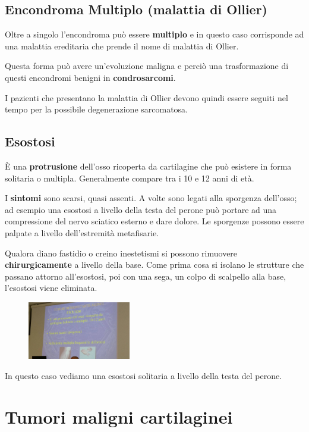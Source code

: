 \subsection{Encondroma Multiplo (malattia di Ollier)}

Oltre a singolo l'encondroma può essere \textbf{multiplo} e in questo caso corrisponde ad una malattia ereditaria che prende il nome di malattia di Ollier.

Questa forma può avere un'evoluzione maligna e perciò una trasformazione di questi encondromi benigni in \textbf{condrosarcomi}.

I pazienti che presentano la malattia di Ollier devono quindi essere seguiti nel tempo per la possibile degenerazione sarcomatosa.

\subsection{Esostosi}

È una \textbf{protrusione} dell'osso ricoperta da cartilagine che può esistere in forma solitaria o multipla. Generalmente compare tra i 10 e 12 anni di età.

I \textbf{sintomi} sono scarsi, quasi assenti. A volte sono legati alla sporgenza dell'osso; ad esempio una esostosi a livello della testa del perone può portare ad una compressione del nervo sciatico esterno e dare dolore. Le sporgenze possono essere palpate a livello dell'estremità
metafisarie.

Qualora diano fastidio o creino inestetismi si possono rimuovere \textbf{chirurgicamente} a livello della base. Come prima cosa si isolano le strutture che passano attorno all'esostosi, poi con una sega, un colpo di scalpello alla base, l'esostosi viene eliminata.

\begin{figure}[!ht]
\centering
\includegraphics[width=0.4\textwidth]{011/image2.jpeg}
\end{figure}

In questo caso vediamo una esostosi solitaria a livello della testa del perone.

\section{Tumori maligni cartilaginei}

